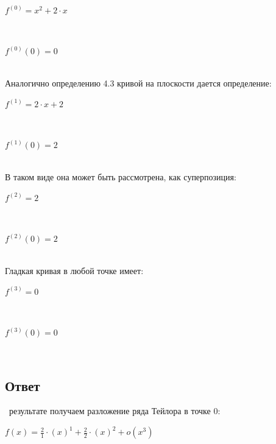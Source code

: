 \documentclass[a4paper,14pt]{extarticle}
\begin{document}
\begin{center}$f^{\left(0\right)} = x^2+2 \cdot x$\end{center}\ 
\begin{center}$f^{\left(0\right)}\left(0\right) = 0
$\end{center}\ \newline \\ 
Аналогично определению 4.3 кривой на плоскости дается определение: \\ 

\begin{center}$f^{\left(1\right)} = 2 \cdot x+2$\end{center}\ 
\begin{center}$f^{\left(1\right)}\left(0\right) = 2
$\end{center}\ \newline \\ 
В таком виде она может быть рассмотрена, как суперпозиция: \\ 

\begin{center}$f^{\left(2\right)} = 2$\end{center}\ 
\begin{center}$f^{\left(2\right)}\left(0\right) = 2
$\end{center}\ \newline \\ 
Гладкая кривая в любой точке имеет: \\ 

\begin{center}$f^{\left(3\right)} = 0$\end{center}\ 
\begin{center}$f^{\left(3\right)}\left(0\right) = 0
$\end{center}\ \newline \\ 
\subsection{Ответ}\  результате получаем разложение ряда Тейлора в точке 0:\begin{center}$f\left(x\right) = \frac{2}{1} \cdot{(x)^{1}} + \frac{2}{2} \cdot{(x)^{2}} + o(x^{3})$ \end{center}\ 
\end{document}
